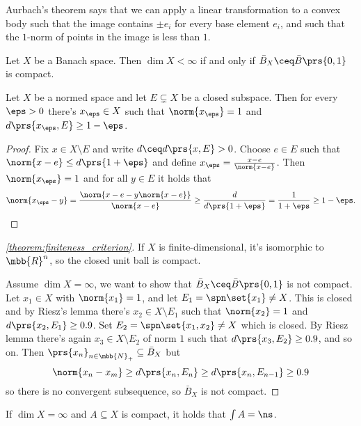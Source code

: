 \documentclass[10pt, twoside]{book}
\begin{document}
Aurbach's theorem says that we can apply a linear transformation to a convex body such that the image contains $\pm e_i$ for every base element $e_i$, and such that the $1$-norm of points in the image is less than $1$.

\begin{theorem}\label{theorem:finiteness_criterion}
Let $X$ be a Banach space. Then $\dim X < \infty$ if and only if $\bar{B}_X \ceq \bar{B}\prs{0,1}$ is compact.
\end{theorem}

\begin{lemma}
Let $X$ be a normed space and let $E \subsetneq X$ be a closed subspace. Then for every $\eps > 0$ there's $x_\eps \in X$ such that $\norm{x_\eps} = 1$ and $d\prs{x_\eps, E} \geq 1 - \eps$.
\end{lemma}

\begin{proof}
Fix $x \in X \setminus E$ and write $d \ceq d\prs{x, E} > 0$. Choose $e \in E$ such that $\norm{x-e} \leq d\prs{1+\eps}$ and define $x_\eps = \frac{x-e}{\norm{x-e}}$. Then $\norm{x_\eps} = 1$ and for all $y \in E$ it holds that
\[\norm{x_{\eps} - y} = \frac{\norm{x-e - y \norm{x-e}}}{\norm{x-e}} \geq \frac{d}{d\prs{1+\eps}}= \frac{1}{1+\eps} \geq 1 - \eps \text{.}\]
\end{proof}

\begin{proof}[\ref{theorem:finiteness_criterion}]
If $X$ is finite-dimensional, it's isomorphic to $\mbb{R}^n$, so the closed unit ball is compact.

Assume $\dim X = \infty$, we want to show that $\bar{B}_X \ceq \bar{B}\prs{0,1}$ is not compact. Let $x_1 \in X$ with $\norm{x_1} = 1$, and let $E_1 = \spn\set{x_1} \neq X$. This is closed and by Riesz's lemma there's $x_2 \in X \setminus E_1$ such that $\norm{x_2} = 1$ and $d\prs{x_2, E_1} \geq 0.9$. Set $E_2 = \spn\set{x_1, x_2} \neq X$ which is closed. By Riesz lemma there's again $x_3 \in X \setminus E_2$ of norm $1$ such that $d\prs{x_3, E_2} \geq 0.9$, and so on. Then
$\prs{x_n}_{n \in \mbb{N}_+} \subseteq \bar{B}_X$ but \[\norm{x_n - x_m} \geq d\prs{x_n, E_n} \geq d\prs{x_n, E_{n-1}} \geq 0.9\] so there is no convergent subsequence, so $\bar{B}_X$ is not compact.
\end{proof}

\begin{corollary}
If $\dim X = \infty$ and $A \subseteq X$ is compact, it holds that $\int A = \ns$.
\end{corollary}
\end{document}
